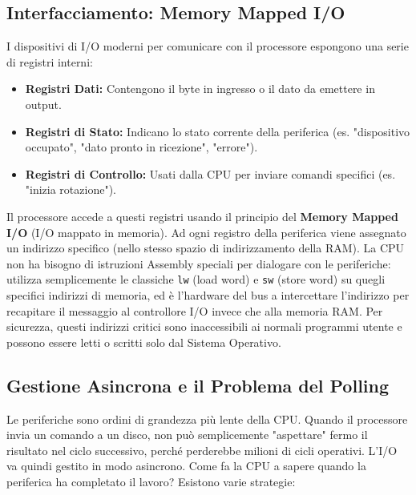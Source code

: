 \documentclass[12pt, a4paper]{article}
\begin{document}
\subsection{Interfacciamento: Memory Mapped I/O}
I dispositivi di I/O moderni per comunicare con il processore espongono una serie di registri interni:
\begin{itemize}
    \item \textbf{Registri Dati:} Contengono il byte in ingresso o il dato da emettere in output.
    \item \textbf{Registri di Stato:} Indicano lo stato corrente della periferica (es. "dispositivo occupato", "dato pronto in ricezione", "errore").
    \item \textbf{Registri di Controllo:} Usati dalla CPU per inviare comandi specifici (es. "inizia rotazione").
\end{itemize}
Il processore accede a questi registri usando il principio del \textbf{Memory Mapped I/O} (I/O mappato in memoria). Ad ogni registro della periferica viene assegnato un indirizzo specifico (nello stesso spazio di indirizzamento della RAM).
La CPU non ha bisogno di istruzioni Assembly speciali per dialogare con le periferiche: utilizza semplicemente le classiche \texttt{lw} (load word) e \texttt{sw} (store word) su quegli specifici indirizzi di memoria, ed è l'hardware del bus a intercettare l'indirizzo per recapitare il messaggio al controllore I/O invece che alla memoria RAM.
Per sicurezza, questi indirizzi critici sono inaccessibili ai normali programmi utente e possono essere letti o scritti solo dal Sistema Operativo.

\subsection{Gestione Asincrona e il Problema del Polling}
Le periferiche sono ordini di grandezza più lente della CPU. Quando il processore invia un comando a un disco, non può semplicemente "aspettare" fermo il risultato nel ciclo successivo, perché perderebbe milioni di cicli operativi. L'I/O va quindi gestito in modo asincrono. Come fa la CPU a sapere quando la periferica ha completato il lavoro? Esistono varie strategie:
\end{document}
